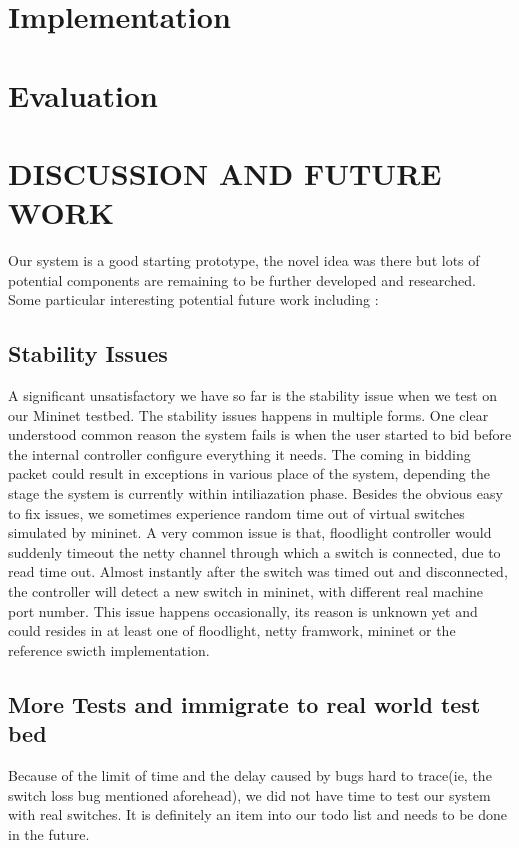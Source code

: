 \documentclass[a4paper,11pt,twocolumn]{article}
\begin{document}
\section{Implementation}


\section{Evaluation}

\section{DISCUSSION AND FUTURE WORK}

Our system is a good starting prototype, the novel idea was there but lots of potential components are remaining to be 
further developed and researched. Some particular interesting potential future work including :

\subsection{Stability Issues}
A significant unsatisfactory we have so far is the stability issue when we test on our Mininet testbed. 
The stability issues happens in multiple forms.  One clear understood common reason the system fails is when the user 
started to bid before the internal controller configure everything it needs. The coming in bidding packet could result in
 exceptions in various place of the system, depending the stage the system is currently within intiliazation phase. 
Besides the obvious easy to fix issues, we sometimes experience random time out of virtual switches simulated by mininet. 
A very common issue is that, floodlight controller would suddenly timeout the netty channel through which a switch is connected, 
due to read time out. Almost instantly after the switch was timed out and disconnected, the controller will detect a new switch 
in mininet, with different real machine port number. This issue happens occasionally, its reason is unknown yet and could resides
 in at least one of floodlight, netty framwork, mininet  or the reference swicth implementation.

\subsection{More Tests and immigrate to real world test bed}
Because of the limit of time and the delay caused by bugs hard to trace(ie, the switch loss bug mentioned aforehead), 
we did not have time to test our system with real switches. It is definitely an item into our todo list and needs to be done in the future.
\end{document}
